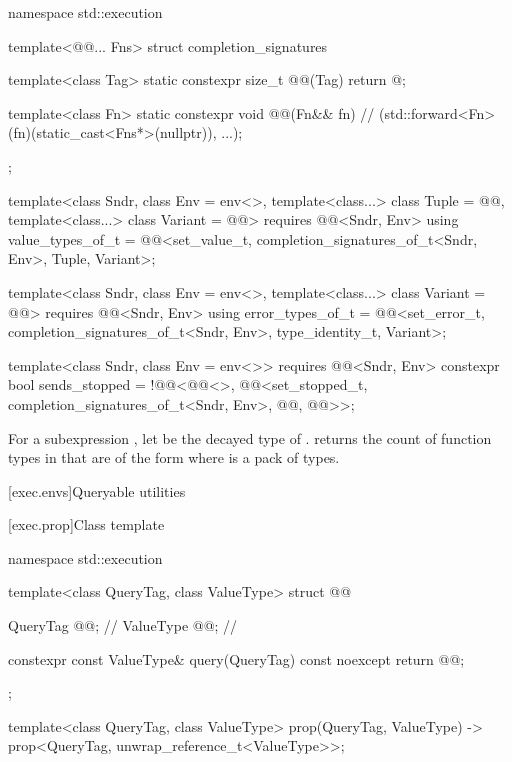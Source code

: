 \pnum
{}%
%
%
\begin{codeblock}
namespace std::execution {
  template<@@... Fns>
    struct completion_signatures {
      template<class Tag>
        static constexpr size_t @@(Tag) { return @\seebelow@; }

      template<class Fn>
        static constexpr void @@(Fn&& fn) {               // \expos
          (std::forward<Fn>(fn)(static_cast<Fns*>(nullptr)), ...);
        }
    };

  template<class Sndr, class Env = env<>,
           template<class...> class Tuple = @@,
           template<class...> class Variant = @@>
      requires @@<Sndr, Env>
    using value_types_of_t =
      @@<set_value_t, completion_signatures_of_t<Sndr, Env>, Tuple, Variant>;

  template<class Sndr, class Env = env<>,
           template<class...> class Variant = @@>
      requires @@<Sndr, Env>
    using error_types_of_t =
      @@<set_error_t, completion_signatures_of_t<Sndr, Env>,
                        type_identity_t, Variant>;

  template<class Sndr, class Env = env<>>
      requires @@<Sndr, Env>
    constexpr bool sends_stopped =
      !@@<@@<>,
               @@<set_stopped_t, completion_signatures_of_t<Sndr, Env>,
                                 @@, @@>>;
}
\end{codeblock}

\pnum
For a subexpression ,
let  be the decayed type of .
returns the count of function types in  that
are of the form  where  is a pack of types.

[exec.envs]{Queryable utilities}

[exec.prop]{Class template }

\begin{codeblock}
namespace std::execution {
  template<class QueryTag, class ValueType>
  struct @@ {
    QueryTag @@;            // \expos
    ValueType @@;           // \expos

    constexpr const ValueType& query(QueryTag) const noexcept {
      return @@;
    }
  };

  template<class QueryTag, class ValueType>
    prop(QueryTag, ValueType) -> prop<QueryTag, unwrap_reference_t<ValueType>>;
}
\end{codeblock}


